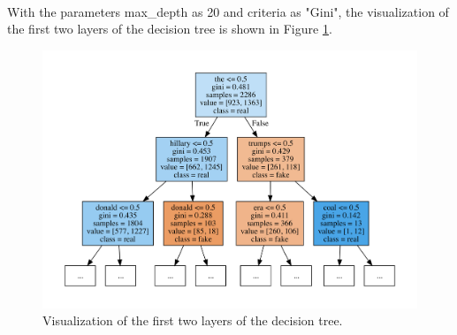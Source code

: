 \documentclass{myhw}
\begin{document}
\begin{homeworkProblem}
\begin{homeworkSection}
\\
With the parameters max\_depth as 20 and criteria as "Gini", the visualization of the first two layers of the decision tree is shown in Figure \ref{FIG:TREE}.
\begin{figure}[h]
  \centering
  \includegraphics[width=.8\textwidth]{tree.pdf} 
  \caption{Visualization of the first two layers of the decision tree.}
  \label{FIG:TREE}
\end{figure}
\end{homeworkSection}
\end{homeworkProblem}
\end{document}

